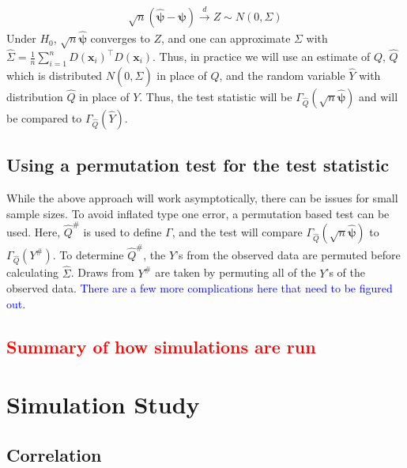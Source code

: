 \documentclass{article}
\newcommand{\sh}{\textcolor{red}}
\newcommand{\rvv}{Y}
\newcommand{\distv}{Q}
\begin{document}
\begin{align*}
    \sqrt{n}\left(\hat{\boldsymbol{\psi}} - \boldsymbol{\psi}\right) \xrightarrow{d} Z \sim N\left(0, \Sigma\right)
\end{align*}
Under $H_0$, $\sqrt{n}\hat{\boldsymbol{\psi}}$ converges to $Z$, and one can approximate $\Sigma$ with $\widehat{\Sigma} = \frac{1}{n}\sum_{i = 1}^n D(\boldsymbol{x}_i)^\top D(\boldsymbol{x}_i)$.  Thus, in practice we will use an estimate of $\distv$, $\hat{\distv}$ which is distributed $N(0, \widehat{\Sigma})$ in place of $\distv$, and the random variable $\hat{\rvv}$ with distribution $\hat{\distv}$ in place of $\rvv$.  Thus, the test statistic will be $\Gamma_{\hat{\distv}}(\sqrt{n} \hat{\boldsymbol{\psi}})$ and will be compared to $\Gamma_{\hat{\distv}}(\hat{\rvv})$.

\subsection{Using a permutation test for the test statistic}
While the above approach will work asymptotically, there can be issues for small sample sizes.  To avoid inflated type one error, a permutation based test can be used.  Here, $\hat{\distv}^\#$ is used to define $\Gamma$, and the test will compare $\Gamma_{\hat{\distv}}(\sqrt{n} \hat{\boldsymbol{\psi}})$ to $\Gamma_{\hat{\distv}}(\rvv^\#)$. To determine $\hat{\distv}^\#$, the $Y$'s from the observed data are permuted before calculating $\widehat \Sigma$.  Draws from $\rvv^\#$ are taken by permuting all of the $Y$'s of the observed data.  \textcolor{blue}{There are a few more complications here that need to be figured out.}

\sh{\subsection{Summary of how simulations are run}}

\section{Simulation Study}
\label{sec:sim_stdy}
\subsection{Correlation}
\end{document}
